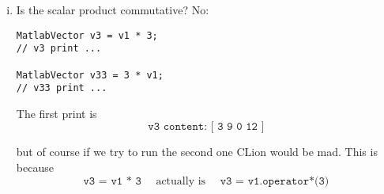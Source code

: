 \begin{enumerate}[$\triangleright$]
\begin{enumerate}[(i)]
\begin{lstlisting}
MatlabVector v1;

v1.set(0, 1);
v1.set(1, 3);
v1.set(3,4);
cout << "v1 content: [ ";
v1.print();
cout << "]\n\n";

MatlabVector v2;

v2.set(0, 4);
v2.set(1, 2);
cout << "v2 content: [ ";
v2.print();
cout << "]\n\n";

MatlabVector sum1, sum2;

sum1 = v2 + v1; // smallest + biggest
cout << "v2 + v1 content: [ ";
sum1.print();
cout << "]\n\n";

sum2 = v1 + v2; // biggest + smallest
cout << "v1 + v2 content: [ ";
sum2.print();
cout << "]\n\n";
\end{lstlisting}
\begin{align*}
\texttt{v1 content: } &\texttt{[ 1 3 0 4 ]} \\
\texttt{v2 content: } &\texttt{[ 4 2 ]} \\
\texttt{v2 + v1 content: } &\texttt{[ 5 5 ]} \\
\texttt{v1 + v2 content: } &\texttt{[ 5 5 0 4 ]}
\end{align*}

\begin{itemize}
    \item if the first addendum is smaller, we neglect the \emph{extra} terms of the bigger addendum, and the sum has the same size as the smallest one; 
    \item if the first addendum is bigger, the second automatically grow to match the size of the first and then the sum is computed.
\end{itemize}

\textbf{Remember:} the sum always has the size of the first addendum $\Longrightarrow$ the sum is'nt commutative.

\item Is the scalar product commutative? No:
\begin{lstlisting}
MatlabVector v3 = v1 * 3;
// v3 print ...

MatlabVector v33 = 3 * v1;
// v33 print ...  
\end{lstlisting}

The first print is
\begin{equation*}
\texttt{v3 content: [ 3 9 0 12 ]}
\end{equation*}

but of course if we try to run the second one CLion would be mad. This is because
\begin{equation*}
\texttt{v3 = v1 * 3}\quad\text{ actually is }\quad \texttt{v3 = v1.operator*(3)}   
\end{equation*}


\end{enumerate}
\end{enumerate}
